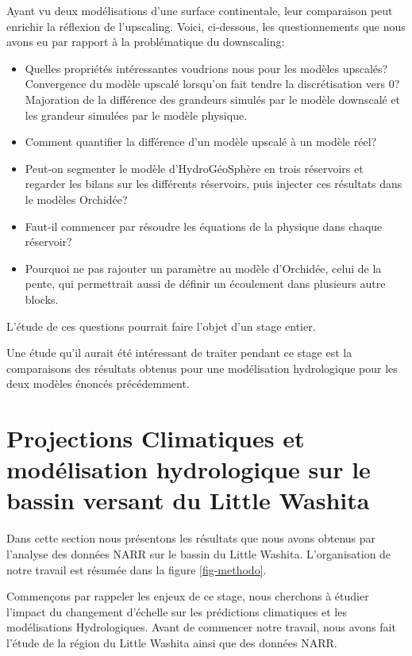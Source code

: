 \documentclass[a4paper,11pt]{article}
\numberwithin{equation}{section}
\begin{document}
Ayant vu deux modélisations d'une surface continentale, leur comparaison peut enrichir la réflexion de l'upscaling. Voici, ci-dessous, les questionnements que nous avons eu par rapport à la problématique du downscaling:

\begin{itemize}
	\item Quelles propriétés intéressantes voudrions nous pour les modèles upscalés? 
	\subitem Convergence du modèle upscalé lorsqu'on fait tendre la discrétisation vers $0$? 
	\subitem Majoration de la différence des grandeurs simulés par le modèle downscalé et les grandeur simulées par le modèle physique.   
	\item Comment quantifier la différence d'un modèle upscalé à un modèle réel?
	\item Peut-on segmenter le modèle d'HydroGéoSphère en trois réservoirs et regarder les bilans sur les différents réservoirs, puis injecter ces résultats dans le modèles Orchidée?
	\item Faut-il commencer par résoudre les équations de la physique dans chaque réservoir? \item Pourquoi ne pas rajouter un paramètre au modèle d'Orchidée, celui de la pente, qui permettrait aussi de définir un écoulement dans plusieurs autre blocks.
\end{itemize}

L'étude de ces questions pourrait faire l'objet d'un stage entier. 

\vspace{0.7 cm}

Une étude qu'il aurait été intéressant de traiter pendant ce stage est la comparaisons des résultats obtenus pour une modélisation hydrologique pour les deux modèles énoncés précédemment.
 
\newpage
\section{Projections Climatiques et modélisation hydrologique sur le bassin versant du Little Washita}

\label{ch:proj-climatique-mod-hydro}

Dans cette section nous présentons les résultats que nous avons obtenus par l'analyse des données NARR sur le bassin du Little Washita. L'organisation de notre travail est résumée dans la figure \ref{fig-methodo}.

Commençons par rappeler les enjeux de ce stage, nous cherchons à étudier l'impact du changement d'échelle sur les prédictions climatiques et les modélisations Hydrologiques. Avant de commencer notre travail, nous avons fait l'étude de la région du Little Washita ainsi que des données NARR.
\end{document}
